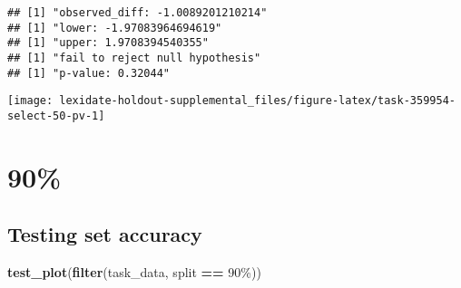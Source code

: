 \documentclass[
]{book}
\newenvironment{Shaded}{\begin{snugshade}}{\end{snugshade}}
\newcommand{\AttributeTok}[1]{\textcolor[rgb]{0.13,0.29,0.53}{#1}}
\newcommand{\DecValTok}[1]{\textcolor[rgb]{0.00,0.00,0.81}{#1}}
\newcommand{\FunctionTok}[1]{\textcolor[rgb]{0.13,0.29,0.53}{\textbf{#1}}}
\newcommand{\NormalTok}[1]{#1}
\newcommand{\OtherTok}[1]{\textcolor[rgb]{0.56,0.35,0.01}{#1}}
\newcommand{\SpecialCharTok}[1]{\textcolor[rgb]{0.81,0.36,0.00}{\textbf{#1}}}
\newcommand{\StringTok}[1]{\textcolor[rgb]{0.31,0.60,0.02}{#1}}
\begin{document}
\begin{Shaded}
\end{Shaded}

\begin{verbatim}
## [1] "observed_diff: -1.0089201210214"
## [1] "lower: -1.97083964694619"
## [1] "upper: 1.9708394540355"
## [1] "fail to reject null hypothesis"
## [1] "p-value: 0.32044"
\end{verbatim}

\texttt{[image: lexidate-holdout-supplemental\_files/figure-latex/task-359954-select-50-pv-1]}

\hypertarget{section-8}{%
\section{90\%}\label{section-8}}

\hypertarget{testing-set-accuracy-8}{%
\subsection{Testing set accuracy}\label{testing-set-accuracy-8}}

\begin{Shaded}
\begin{Highlighting}[]
\FunctionTok{test\_plot}\NormalTok{(}\FunctionTok{filter}\NormalTok{(task\_data, split }\SpecialCharTok{==} \StringTok{\textquotesingle{}90\%\textquotesingle{}}\NormalTok{))}
\end{Highlighting}
\end{Shaded}
\end{document}
